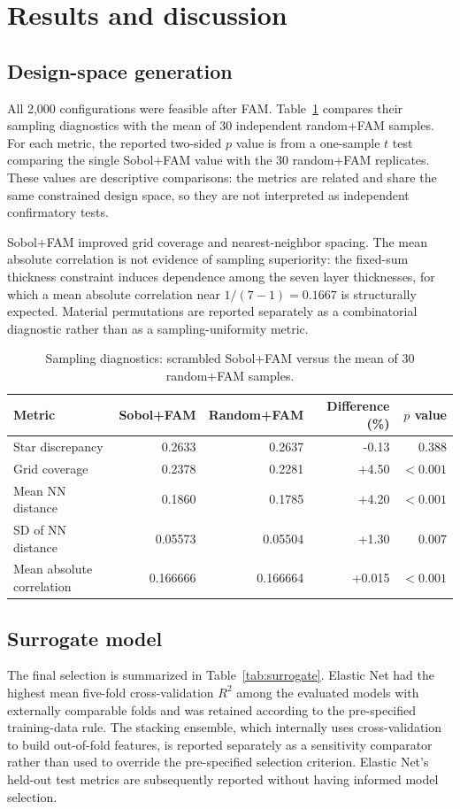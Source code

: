 \documentclass[preprint,12pt]{elsarticle}
\begin{document}
\section{Results and discussion}
\subsection{Design-space generation}
All 2,000 configurations were feasible after FAM. Table~\ref{tab:sampling} compares their sampling diagnostics with the mean of 30 independent random+FAM samples. For each metric, the reported two-sided $p$ value is from a one-sample $t$ test comparing the single Sobol+FAM value with the 30 random+FAM replicates. These values are descriptive comparisons: the metrics are related and share the same constrained design space, so they are not interpreted as independent confirmatory tests.

Sobol+FAM improved grid coverage and nearest-neighbor spacing. The mean absolute correlation is not evidence of sampling superiority: the fixed-sum thickness constraint induces dependence among the seven layer thicknesses, for which a mean absolute correlation near $1/(7-1)=0.1667$ is structurally expected. Material permutations are reported separately as a combinatorial diagnostic rather than as a sampling-uniformity metric.

\begin{table}[htbp]
\centering
\caption{Sampling diagnostics: scrambled Sobol+FAM versus the mean of 30 random+FAM samples.}
\label{tab:sampling}
\begin{tabular}{lrrrr}
\toprule
Metric & Sobol+FAM & Random+FAM & Difference (\%) & $p$ value\\
\midrule
Star discrepancy & 0.2633 & 0.2637 & -0.13 & 0.388\\
Grid coverage & 0.2378 & 0.2281 & +4.50 & $<0.001$\\
Mean NN distance & 0.1860 & 0.1785 & +4.20 & $<0.001$\\
SD of NN distance & 0.05573 & 0.05504 & +1.30 & 0.007\\
Mean absolute correlation & 0.166666 & 0.166664 & +0.015 & $<0.001$\\
\bottomrule
\end{tabular}
\end{table}

\subsection{Surrogate model}
The final selection is summarized in Table~\ref{tab:surrogate}. Elastic Net had the highest mean five-fold cross-validation $R^2$ among the evaluated models with externally comparable folds and was retained according to the pre-specified training-data rule. The stacking ensemble, which internally uses cross-validation to build out-of-fold features, is reported separately as a sensitivity comparator rather than used to override the pre-specified selection criterion. Elastic Net's held-out test metrics are subsequently reported without having informed model selection.
\end{document}

